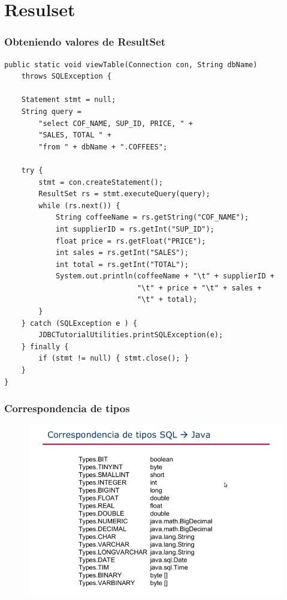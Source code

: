 \documentclass{beamer}
\begin{document}
\section{Resulset}
\begin{frame}[fragile]
\frametitle{Obteniendo valores de ResultSet}
\begin{tiny}
\begin{verbatim}
public static void viewTable(Connection con, String dbName)
    throws SQLException {

    Statement stmt = null;
    String query =
        "select COF_NAME, SUP_ID, PRICE, " +
        "SALES, TOTAL " +
        "from " + dbName + ".COFFEES";

    try {
        stmt = con.createStatement();
        ResultSet rs = stmt.executeQuery(query);
        while (rs.next()) {
            String coffeeName = rs.getString("COF_NAME");
            int supplierID = rs.getInt("SUP_ID");
            float price = rs.getFloat("PRICE");
            int sales = rs.getInt("SALES");
            int total = rs.getInt("TOTAL");
            System.out.println(coffeeName + "\t" + supplierID +
                               "\t" + price + "\t" + sales +
                               "\t" + total);
        }
    } catch (SQLException e ) {
        JDBCTutorialUtilities.printSQLException(e);
    } finally {
        if (stmt != null) { stmt.close(); }
    }
}
\end{verbatim}
\end{tiny}
\end{frame}

\begin{frame}
\frametitle{Correspondencia de tipos}
\begin{figure}
\includegraphics[scale=0.5]{imagenes/correspondencia.png}
\end{figure}
\end{frame}
\end{document}
